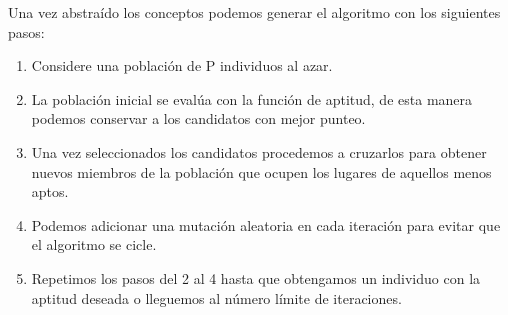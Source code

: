 \documentclass[10pt,twocolumn,a4paper]{articuloAPA}
\begin{document}

Una vez abstraído los conceptos podemos generar el algoritmo con los siguientes pasos:

\begin{enumerate}
  \item Considere una población de P individuos al azar.
  \item La población inicial se evalúa con la función de aptitud, de esta manera podemos conservar a los candidatos con mejor punteo.
  \item 	Una vez seleccionados los candidatos procedemos a cruzarlos para obtener nuevos miembros de la población que ocupen los lugares de aquellos menos aptos.
  \item Podemos adicionar una mutación aleatoria en cada iteración para evitar que el algoritmo se cicle.
  \item Repetimos los pasos del 2 al 4 hasta que obtengamos un individuo con la aptitud deseada o lleguemos al número límite de iteraciones.
\end{enumerate}

\end{document}
